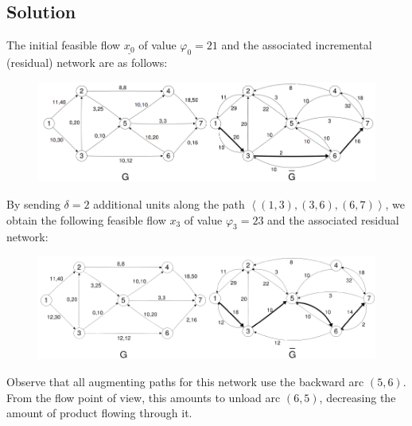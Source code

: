 \documentclass[12pt, a4paper]{report}
\newtheorem[style=M,bodystyle=\normalfont]{theorem}{Theorem}
\newtheorem[style=M,bodystyle=\normalfont]{corollary}{Corollary}
\newtheorem[style=M,bodystyle=\normalfont]{lemma}{Lemma}
\newtheorem[style=M,bodystyle=\normalfont]{definition}{Definition}
\begin{document}
    \subsection*{Solution}
        The initial feasible flow $\underline{x_0}$ of value $\varphi_0 = 21$ and the associated incremental (residual) network are as follows:        
        \begin{figure}[H]
            \centering
            \includegraphics[width=1\linewidth]{images/flow.png}
        \end{figure}
        By sending $\delta = 2$ additional units along the path $\left\langle (1, 3),(3, 6),(6, 7)\right\rangle $, we obtain the following feasible flow 
        $x_3$ of value $\varphi_3 = 23$ and the associated residual network:
        \begin{figure}[H]
            \centering
            \includegraphics[width=1\linewidth]{images/flow1.png}
        \end{figure}
        Observe that all augmenting paths for this network use the backward arc $(5, 6)$. From the flow point of view, this amounts to unload arc $(6, 5)$, decreasing the amount of product flowing
        through it.
\end{document}

